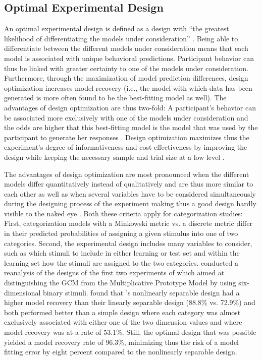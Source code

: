\documentclass[a4paper,man,natbib]{apa6}
\begin{document}
\subsection{Optimal Experimental Design}

An optimal experimental design is defined as a design with ``the greatest likelihood of differentiating the models under consideration'' \cite[][p. 500]{myung2009optimal}. Being able to differentiate between the different models under consideration means that each model is associated with unique behavioral predictions. Participant behavior can thus be linked with greater certainty to one of the models under consideration. Furthermore, through the maximization of model prediction differences, design optimization increases model recovery (i.e., the model with which data has been generated is more often found to be the best-fitting model as well). The advantages of design optimization are thus two-fold: A participant's behavior can be associated more exclusively with one of the models under consideration and the odds are higher that this best-fitting model is the model that was used by the participant to generate her responses \citep[albeit that each scientific model is only an approximation of the participant's cognitive model; see][]{myung2009optimal}. Design optimization maximizes thus the experiment's degree of informativeness and cost-effectiveness by improving the design while keeping the necessary sample and trial size at a low level \citep{cavagnaro2009better, ouyang2016practical, raffert2012optimally, atkinson2007optimum, nelson2005finding}. 

The advantages of design optimization are most pronounced when the different models differ quantitatively instead of qualitatively and are thus more similar to each other as well as when several variables have to be considered simultaneously during the designing process of the experiment making thus a good design hardly visible to the naked eye \citep{myung2009optimal}. Both these criteria apply for categorization studies: First, categorization models with a Minkowski metric vs. a discrete metric differ in their predicted probabilities of assigning a given stimulus into one of two categories. Second, the experimental design includes many variables to consider, such as which stimuli to include in either learning or test set and within the learning set how the stimuli are assigned to the two categories. \cite{myung2009optimal} conducted a reanalysis of the designs of the first two experiments of \cite{smith1998prototypes} which aimed at distinguishing the GCM \citep{nosofsky1986attention} from the Multiplicative Prototype Model \citep{smith1998prototypes} by using six-dimensional binary stimuli. \cite{myung2009optimal} found that \citeauthor{smith1998prototypes}'s nonlinearly separable design had a higher model recovery than their linearly separable design (88.8\% vs. 72.9\%) and both performed better than a simple design where each category was almost exclusively associated with either one of the two dimension values and where model recovery was at a rate of 53.1\%. Still, the optimal design that was possible yielded a model recovery rate of 96.3\%, minimizing thus the risk of a model fitting error by eight percent compared to the nonlinearly separable design.  
\end{document}
